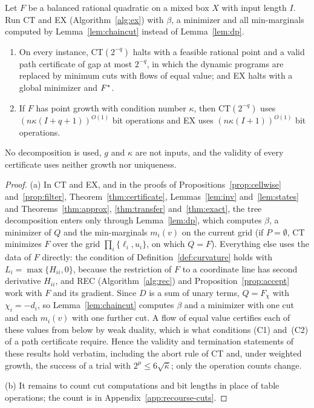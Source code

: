 \begin{theorem}\label{thm:balanced}
Let $F$ be a balanced rational quadratic on a mixed box $X$ with input
length $I$. Run CT and EX (Algorithm~\ref{alg:ex}) with $\beta$, a
minimizer and all min-marginals computed by Lemma~\ref{lem:chaincut} instead
of Lemma~\ref{lem:dp}.
\begin{enumerate}[label=(\alph*)]
\item On every instance, CT$(2^{-q})$ halts with a feasible rational point
and a valid path certificate of gap at most $2^{-q}$, in which the dynamic
programs are replaced by minimum cuts with flows of equal value; and EX
halts with a global minimizer and $F^{*}$.
\item If $F$ has point growth with condition number $\kappa$, then
CT$(2^{-q})$ uses $(n\kappa(I+q+1))^{O(1)}$ bit operations and EX uses
$(n\kappa(I+1))^{O(1)}$ bit operations.
\end{enumerate}
No decomposition is used, $g$ and $\kappa$ are not inputs, and the validity
of every certificate uses neither growth nor uniqueness.
\end{theorem}

\begin{proof}
(a) In CT and EX, and in the proofs of Propositions~\ref{prop:cellwise}
and~\ref{prop:filter}, Theorem~\ref{thm:certificate},
Lemmas~\ref{lem:inv} and~\ref{lem:states} and
Theorems~\ref{thm:approx}, \ref{thm:transfer} and~\ref{thm:exact}, the tree
decomposition enters only through Lemma~\ref{lem:dp}, which computes
$\beta$, a minimizer of $Q$ and the min-marginals $m_i(v)$ on the current
grid (if $P=\emptyset$, CT minimizes $F$ over the grid
$\prod_i\{\ell_i,u_i\}$, on which $Q=F$). Everything else uses the data of
$F$ directly: the condition of Definition~\ref{def:curvature} holds with
$L_i=\max\{H_{ii},0\}$, because the restriction of $F$ to a coordinate line
has second derivative $H_{ii}$, and REC (Algorithm~\ref{alg:rec}) and
Proposition~\ref{prop:accept} work with $F$ and its gradient. Since $D$ is a
sum of unary terms, $Q=F_\chi$ with $\chi_i=-d_i$, so
Lemma~\ref{lem:chaincut} computes $\beta$ and a minimizer with one cut and
each $m_i(v)$ with one further cut. A flow of equal value certifies each of
these values from below by weak duality, which is what conditions (C1)
and~(C2) of a path certificate require. Hence the validity and termination
statements of these results hold verbatim, including the abort rule of CT
and, under weighted growth, the success of a trial with
$2^\mu\le6\sqrt{\bar\kappa}$; only the operation counts change.

(b) It remains to count cut computations and bit lengths in place of table
operations; the count is in Appendix~\ref{app:recourse-cuts}.
\end{proof}

